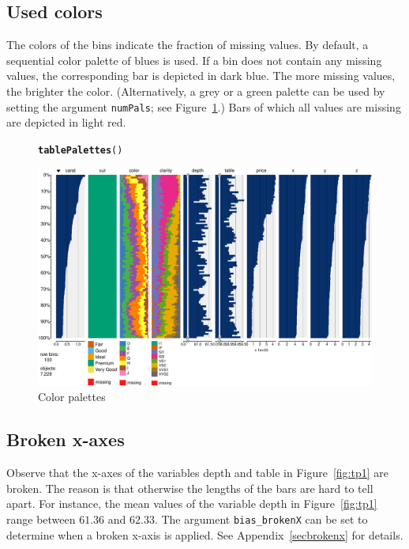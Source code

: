 \documentclass[11pt, fleqn, a4paper]{article}\usepackage{graphicx, color}
\makeatletter
\def\maxwidth{ %
  \ifdim\Gin@nat@width>\linewidth
    \linewidth
  \else
    \Gin@nat@width
  \fi
}
\newcommand{\hlfunctioncall}[1]{\textcolor[rgb]{0.501960784313725,0,0.329411764705882}{\textbf{#1}}}%
\newenvironment{kframe}{%
 \def\FrameCommand##1{\hskip\@totalleftmargin \hskip-\fboxsep
 \colorbox{shadecolor}{##1}\hskip-\fboxsep
     \hskip-\linewidth \hskip-\@totalleftmargin \hskip\columnwidth}%
 \MakeFramed {\advance\hsize-\width
   \@totalleftmargin\z@ \linewidth\hsize
   \@setminipage}}%
 {\par\unskip\endMakeFramed}
\newenvironment{knitrout}{}{} %
\makeatother
\begin{document}
\subsection{Used colors}
The colors of the bins indicate the fraction of missing values. By default, a sequential color palette of blues is used. If a bin does not contain any missing values, the corresponding bar is depicted in dark blue. The more missing values, the brighter the color. (Alternatively, a grey or a green palette can be used by setting the argument {\tt numPals}; see Figure~\ref{fig:pals}.) Bars of which all values are missing are depicted in light red.

\begin{figure}[htp]
\begin{knitrout}
\color{fgcolor}\begin{kframe}
\begin{alltt}
\hlfunctioncall{tablePalettes}()
\end{alltt}
\end{kframe}\includegraphics[width=\maxwidth]{figure/chunk5} 
\end{knitrout}

\caption{Color palettes}
\label{fig:pals}
\end{figure}

\subsection{Broken x-axes}

Observe that the x-axes of the variables depth and table in Figure~\ref{fig:tp1} are broken. The reason is that otherwise the lengths of the bars are hard to tell apart. For instance, the mean values of the variable depth in Figure~\ref{fig:tp1} range between $61.36$ and $62.33$. The argument {\tt bias\_brokenX} can be set to determine when a broken x-axis is applied. See Appendix~\ref{secbrokenx} for details.
\end{document}
